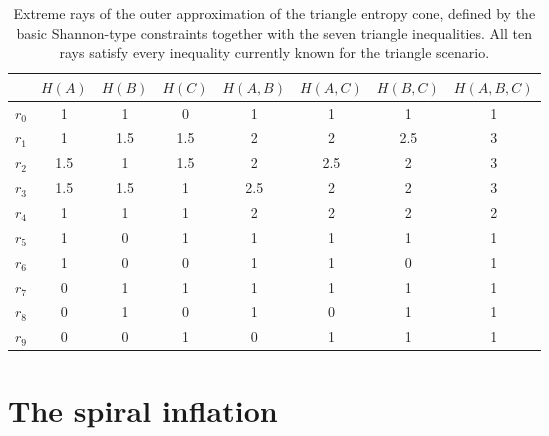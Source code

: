 \documentclass[reprint,pra, twocolumn, amsmath,amssymb,
 aps,superscriptaddress,]{revtex4-2}
\begin{document}
\begin{table}[h]
    \centering
    \begin{tabular}{c|ccccccc}
        & $H(A)$ & $H(B)$ & $H(C)$ & $H(A,B)$ & $H(A,C)$ & $H(B,C)$ & $H(A,B,C)$ \\
        \hline
        $r_0$ & 1   & 1   & 0   & 1   & 1   & 1   & 1 \\
        $r_1$ & 1   & 1.5 & 1.5 & 2   & 2   & 2.5 & 3 \\
        $r_2$ & 1.5 & 1   & 1.5 & 2   & 2.5 & 2   & 3 \\
        $r_3$ & 1.5 & 1.5 & 1   & 2.5 & 2   & 2   & 3 \\
        $r_4$ & 1   & 1   & 1   & 2   & 2   & 2   & 2 \\
        $r_5$ & 1   & 0   & 1   & 1   & 1   & 1   & 1 \\
        $r_6$ & 1   & 0   & 0   & 1   & 1   & 0   & 1 \\
        $r_7$ & 0   & 1   & 1   & 1   & 1   & 1   & 1 \\
        $r_8$ & 0   & 1   & 0   & 1   & 0   & 1   & 1 \\
        $r_9$ & 0   & 0   & 1   & 0   & 1   & 1   & 1 \\
    \end{tabular}
    \caption{Extreme rays of the outer approximation of the triangle entropy cone, defined by the basic Shannon-type constraints together with the seven triangle inequalities. All ten rays satisfy every inequality currently known for the triangle scenario.}
    \label{tab:triangle-rays}
\end{table}

\section{The spiral inflation}
\end{document}
